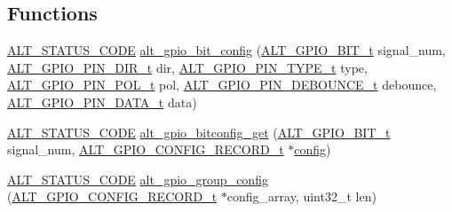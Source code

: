 \subsection*{Functions}
\begin{DoxyCompactItemize}
\item 
\mbox{\hyperlink{hwlib_8h_abdb0d369f069723ca55d6c94bcaaaa12}{A\+L\+T\+\_\+\+S\+T\+A\+T\+U\+S\+\_\+\+C\+O\+DE}} \mbox{\hyperlink{group__ALT__GPIO__BITVIEW_ga0cd38a49d1333e3d9fea4d617918fd91}{alt\+\_\+gpio\+\_\+bit\+\_\+config}} (\mbox{\hyperlink{group__ALT__GPIO__BITVIEW_ga6d149a5961bef8b91b8108e3838b1e09}{A\+L\+T\+\_\+\+G\+P\+I\+O\+\_\+B\+I\+T\+\_\+t}} signal\+\_\+num, \mbox{\hyperlink{group__ALT__GPIO__API__CONFIG_ga96132f0cfe4bb0ffc0f9ec8a392a45f3}{A\+L\+T\+\_\+\+G\+P\+I\+O\+\_\+\+P\+I\+N\+\_\+\+D\+I\+R\+\_\+t}} dir, \mbox{\hyperlink{group__ALT__GPIO__API__CONFIG_gafa3659cf3d59e915a16c591a73258eef}{A\+L\+T\+\_\+\+G\+P\+I\+O\+\_\+\+P\+I\+N\+\_\+\+T\+Y\+P\+E\+\_\+t}} type, \mbox{\hyperlink{group__ALT__GPIO__API__CONFIG_gac97da06ff658611bcd2b12753dfc4a10}{A\+L\+T\+\_\+\+G\+P\+I\+O\+\_\+\+P\+I\+N\+\_\+\+P\+O\+L\+\_\+t}} pol, \mbox{\hyperlink{group__ALT__GPIO__API__CONFIG_gac48653c26697d3fd17d9029252655ac2}{A\+L\+T\+\_\+\+G\+P\+I\+O\+\_\+\+P\+I\+N\+\_\+\+D\+E\+B\+O\+U\+N\+C\+E\+\_\+t}} debounce, \mbox{\hyperlink{group__ALT__GPIO__API__CONFIG_ga757cd8797c8bb2ed86d75d961ce9041b}{A\+L\+T\+\_\+\+G\+P\+I\+O\+\_\+\+P\+I\+N\+\_\+\+D\+A\+T\+A\+\_\+t}} data)
\item 
\mbox{\hyperlink{hwlib_8h_abdb0d369f069723ca55d6c94bcaaaa12}{A\+L\+T\+\_\+\+S\+T\+A\+T\+U\+S\+\_\+\+C\+O\+DE}} \mbox{\hyperlink{group__ALT__GPIO__BITVIEW_ga464c591831627234b6b9af12f326c830}{alt\+\_\+gpio\+\_\+bitconfig\+\_\+get}} (\mbox{\hyperlink{group__ALT__GPIO__BITVIEW_ga6d149a5961bef8b91b8108e3838b1e09}{A\+L\+T\+\_\+\+G\+P\+I\+O\+\_\+B\+I\+T\+\_\+t}} signal\+\_\+num, \mbox{\hyperlink{group__ALT__GPIO__BITVIEW_ga4f9ae2a8f2479be9005d07d74e1c91fd}{A\+L\+T\+\_\+\+G\+P\+I\+O\+\_\+\+C\+O\+N\+F\+I\+G\+\_\+\+R\+E\+C\+O\+R\+D\+\_\+t}} $\ast$\mbox{\hyperlink{structconfig__s}{config}})
\item 
\mbox{\hyperlink{hwlib_8h_abdb0d369f069723ca55d6c94bcaaaa12}{A\+L\+T\+\_\+\+S\+T\+A\+T\+U\+S\+\_\+\+C\+O\+DE}} \mbox{\hyperlink{group__ALT__GPIO__BITVIEW_gaa60fc3a860c9c0861ba945b656956aa9}{alt\+\_\+gpio\+\_\+group\+\_\+config}} (\mbox{\hyperlink{group__ALT__GPIO__BITVIEW_ga4f9ae2a8f2479be9005d07d74e1c91fd}{A\+L\+T\+\_\+\+G\+P\+I\+O\+\_\+\+C\+O\+N\+F\+I\+G\+\_\+\+R\+E\+C\+O\+R\+D\+\_\+t}} $\ast$config\+\_\+array, uint32\+\_\+t len)
\item 

\end{DoxyCompactItemize}
